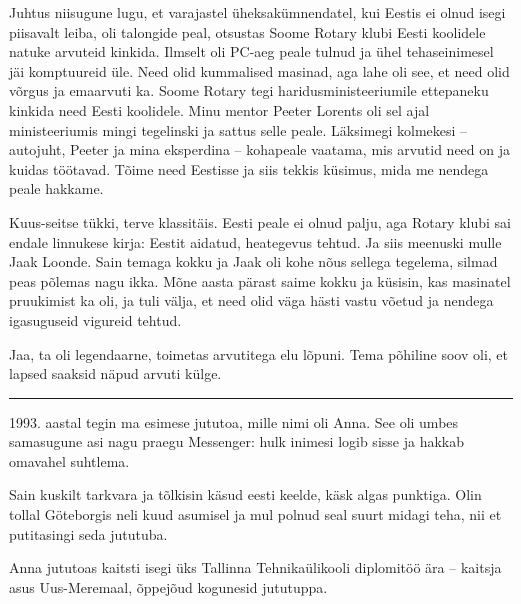 Juhtus niisugune lugu, et varajastel üheksakümnendatel, kui 
Eestis ei olnud isegi piisavalt leiba, oli talongide peal, otsustas 
Soome Rotary klubi Eesti koolidele natuke arvuteid kinkida. Ilmselt oli PC-aeg peale tulnud ja ühel tehaseinimesel jäi komptuureid üle. 
Need olid kummalised masinad, aga lahe oli see, et need olid võrgus ja emaarvuti ka. Soome Rotary tegi haridusministeeriumile
ettepaneku kinkida need Eesti koolidele. 
Minu mentor Peeter Lorents oli sel ajal 
ministeeriumis mingi tegelinski ja sattus selle peale. 
Läksimegi kolmekesi – autojuht, Peeter ja mina eksperdina – 
kohapeale vaatama, mis arvutid need on ja kuidas töötavad. Tõime need Eestisse ja siis tekkis küsimus, mida me 
nendega peale hakkame. 


Kuus-seitse tükki, terve klassitäis. Eesti peale ei olnud palju, aga 
Rotary klubi sai endale linnukese kirja: Eestit aidatud, heategevus tehtud. Ja 
siis meenuski mulle Jaak Loonde. Sain temaga kokku ja Jaak 
oli kohe nõus sellega tegelema, silmad peas põlemas nagu ikka. Mõne aasta pärast saime kokku 
ja küsisin, kas masinatel pruukimist ka oli, ja tuli välja, et need olid väga 
hästi vastu võetud ja nendega igasuguseid vigureid tehtud. 


Jaa, ta oli legendaarne, toimetas arvutitega elu lõpuni. Tema põhiline soov oli, et lapsed saaksid näpud arvuti külge.


\bigskip
\noindent\rule{.3\textwidth}{.7pt}
\bigskip

1993. aastal tegin ma esimese 
jututoa, mille nimi oli Anna. See oli umbes samasugune asi nagu praegu Messenger: hulk inimesi logib sisse ja hakkab omavahel suhtlema. 


Sain kuskilt tarkvara ja tõlkisin käsud eesti keelde, käsk algas 
punktiga. Olin tollal Göteborgis neli kuud asumisel ja mul polnud 
seal suurt midagi teha, nii et putitasingi seda jututuba. 

Anna jututoas kaitsti isegi üks Tallinna 
Tehnikaülikooli diplomitöö ära – kaitsja asus 
Uus-Meremaal, õppejõud kogunesid jututuppa.

